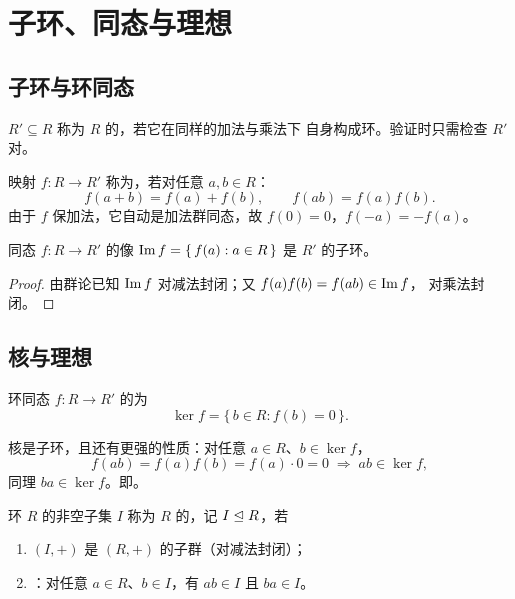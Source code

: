 \section{子环、同态与理想}\label{sec:subring-hom-ideal}

\subsection{子环与环同态}

\begin{definition}[子环]
$R'\subseteq R$ 称为 $R$ 的，若它在同样的加法与乘法下
自身构成环。验证时只需检查 $R'$ 对。
\end{definition}

\begin{definition}[环同态]
映射 $f\colon R\to R'$ 称为，若对任意 $a,b\in R$：
\[
  f(a+b) = f(a) + f(b), \qquad f(ab) = f(a)f(b).
\]
由于 $f$ 保加法，它自动是加法群同态，故 $f(0) = 0$，$f(-a) = -f(a)$。
\end{definition}

\begin{proposition}[像是子环]
同态 $f\colon R\to R'$ 的像 $\mathrm{Im}\, f = \{\,f(a) : a\in R\,\}$ 是 $R'$
的子环。
\end{proposition}

\begin{proof}
由群论已知 $\mathrm{Im}\, f$ 对减法封闭；又 $f(a)f(b) = f(ab)\in\mathrm{Im}\, f$，
对乘法封闭。
\end{proof}

\subsection{核与理想}

\begin{definition}[核]
环同态 $f\colon R\to R'$ 的为
\[
  \ker f = \{\,b\in R : f(b) = 0\,\}.
\]
\end{definition}

核是子环，且还有更强的性质：对任意 $a\in R$、$b\in\ker f$，
\[
  f(ab) = f(a)f(b) = f(a)\cdot 0 = 0 \;\Longrightarrow\; ab\in\ker f,
\]
同理 $ba\in\ker f$。即。

\begin{definition}[理想（Ideal）]
环 $R$ 的非空子集 $I$ 称为 $R$ 的，记 $I\trianglelefteq R$，若
\begin{enumerate}[leftmargin=1.6em,itemsep=2pt]
  \item $(I,+)$ 是 $(R,+)$ 的子群（对减法封闭）；
  \item {}：对任意 $a\in R$、$b\in I$，有 $ab\in I$ 且
        $ba\in I$。
\end{enumerate}
\end{definition}

